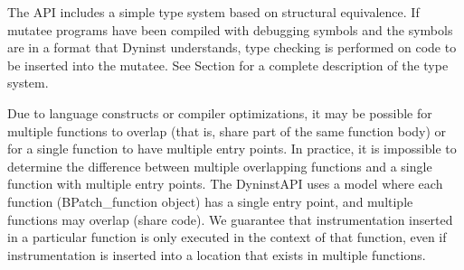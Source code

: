 The API includes a simple type system based on structural equivalence. If mutatee programs have been compiled with
debugging symbols and the symbols are in a format that Dyninst understands, type checking is performed on code to be
inserted into the mutatee. See Section for a complete description of the type system.

Due to language constructs or compiler optimizations, it may be possible for multiple functions to overlap (that is,
share part of the same function body) or for a single function to have multiple entry points. In practice, it is
impossible to determine the difference between multiple overlapping functions and a single function with multiple entry
points. The DyninstAPI uses a model where each function (BPatch\_function object) has a single entry point, and
multiple functions may overlap (share code). We guarantee that instrumentation inserted in a particular function is
only executed in the context of that function, even if instrumentation is inserted into a location that exists in
multiple functions.
